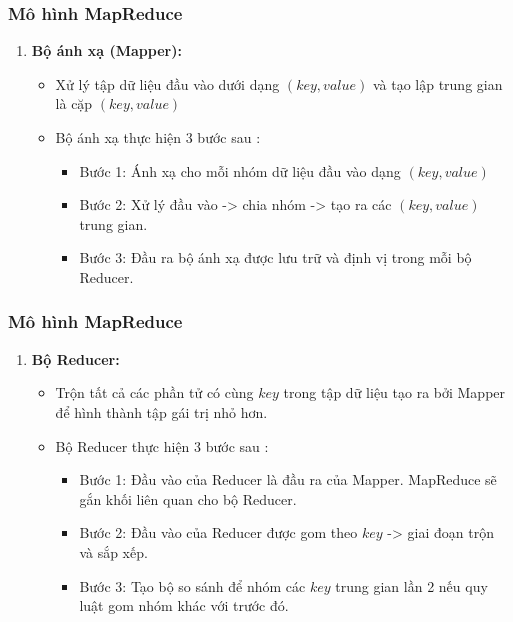 \documentclass[12pt]{beamer}
\begin{document}
	\begin{frame}
		\frametitle{Mô hình MapReduce}
		\begin{enumerate} [\textbf{2.}]
			\item \textbf{Bộ ánh xạ (Mapper):}
				\begin{itemize}
					\item Xử lý tập dữ liệu đầu vào dưới dạng $(key, value)$ và tạo lập trung gian là cặp $(key, value)$
					\item Bộ ánh xạ thực hiện 3 bước sau :
						\begin{itemize}
							\item Bước 1: Ánh xạ cho mỗi nhóm dữ liệu đầu vào dạng $(key, value)$
							\item Bước 2: Xử lý đầu vào -> chia nhóm -> tạo ra các $(key, value)$ trung gian.
							\item Bước 3: Đầu ra bộ ánh xạ được lưu trữ và định vị trong mỗi bộ Reducer.
						\end{itemize}
				\end{itemize}
		\end{enumerate}
	\end{frame}

	\begin{frame}
		\frametitle{Mô hình MapReduce}
		\begin{enumerate} [\textbf{3.}]
			\item \textbf{Bộ Reducer:}
			\begin{itemize}
				\item Trộn tất cả các phần tử có cùng $key$ trong tập dữ liệu tạo ra bởi Mapper để hình thành tập gái trị nhỏ hơn.
				\item Bộ Reducer thực hiện 3 bước sau :
				\begin{itemize}
					\item Bước 1: Đầu vào của Reducer là đầu ra của Mapper. MapReduce sẽ gắn khối liên quan cho bộ Reducer.
					\item Bước 2: Đầu vào của Reducer được gom theo $key$ -> giai đoạn trộn và sắp xếp.
					\item Bước 3: Tạo bộ so sánh để nhóm các $key$ trung gian lần 2 nếu quy luật gom nhóm khác với trước đó.
				\end{itemize}
			\end{itemize}
		\end{enumerate}
	\end{frame}
\end{document}
